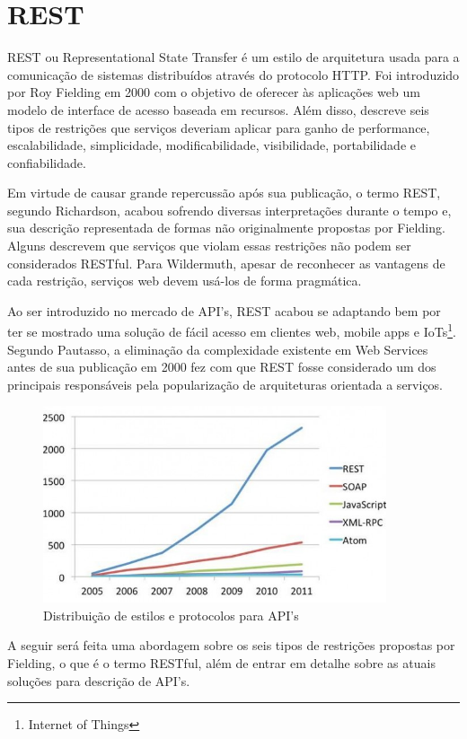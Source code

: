 \section{REST}

REST ou Representational State Transfer é um estilo de arquitetura usada para a comunicação de sistemas distribuídos através do protocolo HTTP. Foi introduzido por Roy Fielding em 2000 com o objetivo de oferecer às aplicações web um modelo de interface de acesso baseada em recursos. Além disso, descreve seis tipos de restrições que serviços deveriam aplicar para ganho de performance, escalabilidade, simplicidade, modificabilidade, visibilidade, portabilidade e confiabilidade.

Em virtude de causar grande repercussão após sua publicação, o termo REST, segundo Richardson, acabou sofrendo diversas interpretações durante o tempo e, sua descrição representada de formas não originalmente propostas por Fielding. Alguns descrevem que serviços que violam essas restrições não podem ser considerados RESTful. Para Wildermuth, apesar de reconhecer as vantagens de cada restrição, serviços web devem usá-los de forma pragmática. \cite{RichardsonEtAl2013} \cite{Wildermuth2015}

Ao ser introduzido no mercado de API's, REST acabou se adaptando bem por ter se mostrado uma solução de fácil acesso em clientes web, mobile apps e IoTs\footnote{
  Internet of Things
}. Segundo Pautasso, a eliminação da complexidade existente em Web Services antes de sua publicação em 2000 fez com que REST fosse considerado um dos principais responsáveis pela popularização de arquiteturas orientada a serviços. \cite{PautassoEtAl2008}

\begin{figure}[H]
  \centering    \includegraphics[width=0.9\textwidth,height=\textheight,keepaspectratio]{figuras/api-styles.jpg}
  \caption{Distribuição de estilos e protocolos para API's}
\end{figure}

A seguir será feita uma abordagem sobre os seis tipos de restrições propostas por Fielding, o que é o termo RESTful, além de entrar em detalhe sobre as atuais soluções para descrição de API's.




